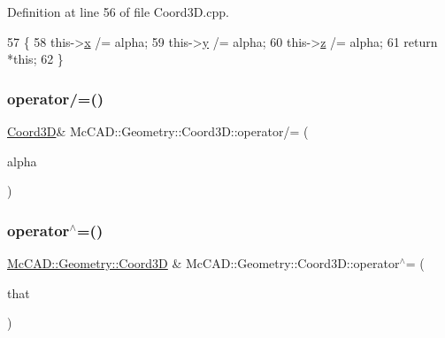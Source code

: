 Definition at line 56 of file Coord3\+D.\+cpp.


\begin{DoxyCode}
57                                 \{
58     this->\hyperlink{classMcCAD_1_1Geometry_1_1Coord3D_a82467d541e4e330484b7f4d589b433b4}{x} /= alpha;
59     this->\hyperlink{classMcCAD_1_1Geometry_1_1Coord3D_af6512434da6e0242b2606e2341abc01d}{y} /= alpha;
60     this->\hyperlink{classMcCAD_1_1Geometry_1_1Coord3D_a5f89140bda6825a0a21d0064d05d9f4b}{z} /= alpha;
61     \textcolor{keywordflow}{return} *\textcolor{keyword}{this};
62 \}
\end{DoxyCode}
\mbox{\label{classMcCAD_1_1Geometry_1_1Coord3D_adb418f45f4bf5f2296b1113f0d69e1d3}} 
\subsubsection{\texorpdfstring{operator/=()}{operator/=()}\hspace{0.1cm}{\footnotesize\ttfamily [2/2]}}
{\footnotesize\ttfamily \hyperlink{classMcCAD_1_1Geometry_1_1Coord3D}{Coord3D}\& Mc\+C\+A\+D\+::\+Geometry\+::\+Coord3\+D\+::operator/= (\begin{DoxyParamCaption}\item[{const \hyperlink{namespaceMcCAD_1_1Geometry_ac043b37a4a7e849fca22869e1982d2f8}{coord\+\_\+type} \&}]{alpha }\end{DoxyParamCaption})}

\mbox{\label{classMcCAD_1_1Geometry_1_1Coord3D_ab0108e5fc1053ec4c31944893a539da0}} 
\subsubsection{\texorpdfstring{operator$^\wedge$=()}{operator^=()}\hspace{0.1cm}{\footnotesize\ttfamily [1/2]}}
{\footnotesize\ttfamily \hyperlink{classMcCAD_1_1Geometry_1_1Coord3D}{Mc\+C\+A\+D\+::\+Geometry\+::\+Coord3D} \& Mc\+C\+A\+D\+::\+Geometry\+::\+Coord3\+D\+::operator$^\wedge$= (\begin{DoxyParamCaption}\item[{const \hyperlink{classMcCAD_1_1Geometry_1_1Coord3D}{Coord3D} \&}]{that }\end{DoxyParamCaption})}



